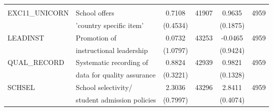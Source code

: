 \documentclass[10pt]{article}
\begin{document}
\begin{table}[H]
\begin{tabulary}{1.0\textwidth}{L L C C C C}
\hline \\
EXC11\_UNICORN & School offers & 0.7108 & 41907 & 0.9635 & 4959 \\ 
& 'country specific item' & (0.4534) &  & (0.1875) &  \\ [0.3em]
LEADINST & Promotion of & 0.0732 & 43253 & -0.0465 & 4959 \\ 
& instructional leadership & (1.0797) &  & (0.9424) &  \\ [0.3em]
QUAL\_RECORD & Systematic recording of & 0.8824 & 42939 & 0.9821 & 4959 \\ 
& data for quality assurance & (0.3221) &  & (0.1328) &  \\ [0.3em]
SCHSEL & School selectivity/ & 2.3036 & 43296 & 2.8411 & 4959 \\ 
& student admission policies & (0.7997) &  & (0.4074) &  \\ [0.3em]
\hline	
\end{tabulary}
\end{table}
	
	
\end{document}
